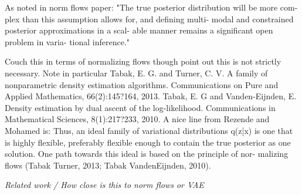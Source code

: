 \documentclass{article}
\begin{document}
 As noted in norm flows paper: "The true posterior distribution will be more com- plex than this assumption allows for, and defining multi- modal and constrained posterior approximations in a scal- able manner remains a significant open problem in varia- tional inference."
 
 Couch this in terms of normalizing flows though point out this is not strictly necessary.     Note in particular 
 Tabak, E. G. and Turner, C. V. A family of nonparametric density estimation algorithms. Communications on Pure and Applied Mathematics, 66(2):145?164, 2013.
Tabak, E. G and Vanden-Eijnden, E. Density estimation by dual ascent of the log-likelihood. Communications in Mathematical Sciences, 8(1):217?233, 2010.
  A nice line from Rezende and Mohamed is: Thus, an ideal family of variational distributions q(z|x) is one that is highly flexible, preferably flexible enough to contain the true posterior as one solution. One path towards this ideal is based on the principle of nor- malizing flows (Tabak Turner, 2013; Tabak VandenEijnden, 2010).
 
\emph{Related work / How close is this to norm flows or VAE}
\end{document}
